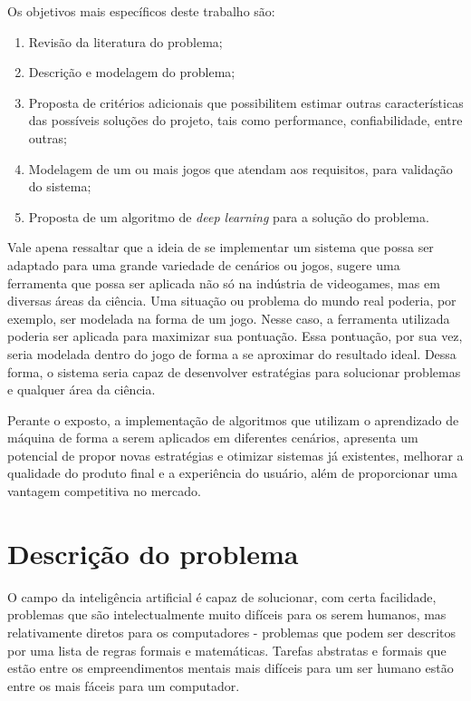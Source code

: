 
 Os objetivos mais específicos deste trabalho são:
 \begin{enumerate}
 	\item Revisão da literatura do problema;
 	\item Descrição e modelagem do problema;
 	\item Proposta de critérios adicionais que possibilitem estimar outras características das possíveis soluções do projeto, tais como performance, confiabilidade, entre outras;
 	\item Modelagem de um ou mais jogos que atendam aos requisitos, para validação do sistema;
 	\item Proposta de um algoritmo de \textit{deep learning} para a solução do problema.
 \end{enumerate}

 Vale apena ressaltar que a ideia de se implementar um sistema que possa ser adaptado para uma grande variedade de cenários ou jogos, sugere uma ferramenta que possa ser aplicada não só na indústria de videogames, mas em diversas áreas da ciência. Uma situação ou problema do mundo real poderia, por exemplo, ser modelada na forma de um jogo. Nesse caso, a ferramenta utilizada poderia ser aplicada para maximizar sua pontuação. Essa pontuação, por sua vez, seria modelada dentro do jogo de forma a se aproximar do resultado ideal. Dessa forma, o sistema seria capaz de desenvolver estratégias para solucionar problemas e qualquer área da ciência.

 Perante o exposto, a implementação de algoritmos que utilizam o aprendizado de máquina de forma a serem aplicados em diferentes cenários,
 apresenta um potencial de propor novas estratégias e otimizar sistemas já existentes, melhorar a qualidade do produto final e a experiência do usuário, além de proporcionar uma vantagem competitiva no mercado.

\section{Descrição do problema}
\label{sec:descricao_do_problema}
O campo da inteligência artificial é capaz de solucionar, com certa facilidade, problemas que são intelectualmente muito difíceis para os serem humanos, mas relativamente diretos para os computadores - problemas que podem ser descritos por uma lista de regras formais e matemáticas. Tarefas abstratas e formais que estão entre os empreendimentos mentais mais difíceis para um ser humano estão entre os mais fáceis para um computador.

